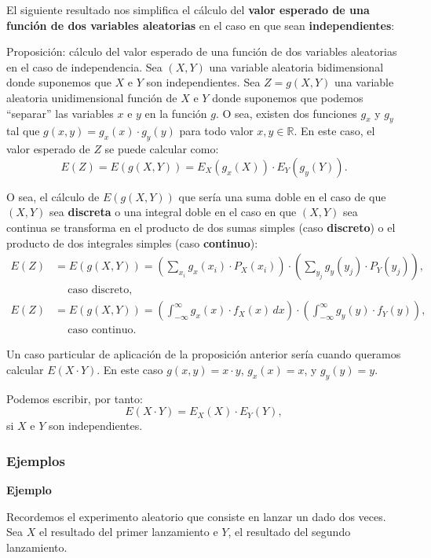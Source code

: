 \documentclass[]{book}
\begin{document}
El siguiente resultado nos simplifica el cálculo del \textbf{valor esperado de una función de dos variables aleatorias} en el caso en que sean \textbf{independientes}:

Proposición: cálculo del valor esperado de una función de dos variables aleatorias en el caso de independencia.
Sea \((X,Y)\) una variable aleatoria bidimensional donde suponemos que \(X\) e \(Y\) son independientes.
Sea \(Z=g(X,Y)\) una variable aleatoria unidimensional función de \(X\) e \(Y\) donde suponemos que podemos ``separar'' las variables \(x\) e \(y\) en la función \(g\). O sea, existen dos funciones \(g_x\) y \(g_y\) tal que \(g(x,y)=g_x(x)\cdot g_y(y)\) para todo valor \(x,y\in\mathbb{R}\). En este caso, el valor esperado de \(Z\) se puede calcular como:
\[
E(Z)=E(g(X,Y))=E_X(g_x(X))\cdot E_Y(g_y(Y)).
\]

O sea, el cálculo de \(E(g(X,Y))\) que sería una suma doble en el caso de que \((X,Y)\) sea \textbf{discreta} o una integral doble en el caso en que \((X,Y)\) sea continua se transforma en el producto de dos sumas simples (caso \textbf{discreto}) o el producto de dos integrales simples (caso \textbf{continuo}):
\[
\begin{array}{rl}
E(Z) & =E(g(X,Y))=\left(\sum_{x_i} g_x(x_i)\cdot P_X(x_i)\right)\cdot \left(\sum_{y_j} g_y(y_j)\cdot P_Y(y_j)\right),\\ &\ \quad \mbox{caso discreto},\\
E(Z) & =E(g(X,Y))=\left(\int_{-\infty}^\infty g_x(x)\cdot f_X(x)\, dx\right)\cdot \left(\int_{-\infty}^\infty g_y(y)\cdot f_Y(y)\right), \\  &\ \quad \mbox{caso continuo}.
\end{array}
\]

Un caso particular de aplicación de la proposición anterior sería cuando queramos calcular \(E(X\cdot Y)\). En este caso \(g(x,y)=x\cdot y\), \(g_x(x)=x\), y \(g_y(y)=y\).

Podemos escribir, por tanto:
\[
E(X\cdot Y)=E_X(X)\cdot E_Y(Y),
\]
si \(X\) e \(Y\) son independientes.

\hypertarget{ejemplos-7}{%
\subsubsection{Ejemplos}\label{ejemplos-7}}

\textbf{Ejemplo}

Recordemos el experimento aleatorio que consiste en lanzar un dado dos veces. Sea \(X\) el resultado del primer lanzamiento e \(Y\), el resultado del segundo lanzamiento.
\end{document}
